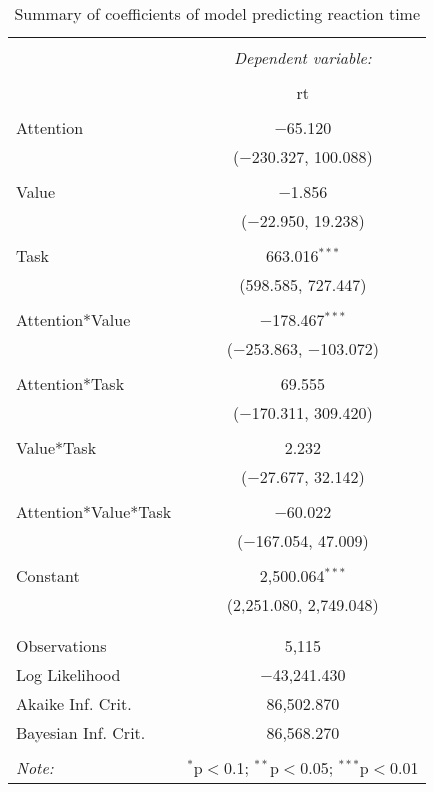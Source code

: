 
\begin{table}[!htbp] \centering 
  \caption{Summary of coefficients of model predicting reaction time} 
  \label{} 
\begin{tabular}{@{\extracolsep{5pt}}lc} 
\\[-1.8ex]\hline 
\hline \\[-1.8ex] 
 & \multicolumn{1}{c}{\textit{Dependent variable:}} \\ 
\cline{2-2} 
\\[-1.8ex] & rt \\ 
\hline \\[-1.8ex] 
 Attention & $-$65.120 \\ 
  & ($-$230.327, 100.088) \\ 
  & \\ 
 Value & $-$1.856 \\ 
  & ($-$22.950, 19.238) \\ 
  & \\ 
 Task & 663.016$^{***}$ \\ 
  & (598.585, 727.447) \\ 
  & \\ 
 Attention*Value & $-$178.467$^{***}$ \\ 
  & ($-$253.863, $-$103.072) \\ 
  & \\ 
 Attention*Task & 69.555 \\ 
  & ($-$170.311, 309.420) \\ 
  & \\ 
 Value*Task & 2.232 \\ 
  & ($-$27.677, 32.142) \\ 
  & \\ 
 Attention*Value*Task & $-$60.022 \\ 
  & ($-$167.054, 47.009) \\ 
  & \\ 
 Constant & 2,500.064$^{***}$ \\ 
  & (2,251.080, 2,749.048) \\ 
  & \\ 
\hline \\[-1.8ex] 
Observations & 5,115 \\ 
Log Likelihood & $-$43,241.430 \\ 
Akaike Inf. Crit. & 86,502.870 \\ 
Bayesian Inf. Crit. & 86,568.270 \\ 
\hline 
\hline \\[-1.8ex] 
\textit{Note:}  & \multicolumn{1}{r}{$^{*}$p$<$0.1; $^{**}$p$<$0.05; $^{***}$p$<$0.01} \\ 
\end{tabular} 
\end{table} 
